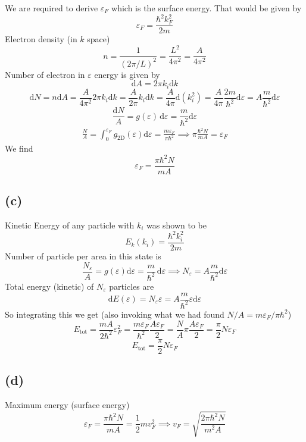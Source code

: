 \documentclass[letter, 10pts]{article}
\newcommand{\hb}{\hbar}
\begin{document}
We are required to derive $\varepsilon_F$ which is the surface energy. That would be given by 
\[
\varepsilon_F = \frac{\hb^2 k_F^2}{2 m}
\] 
Electron density (in $k$ space) \[
n = \frac{1}{(2 \pi  / L )^2 } = \frac{L^2}{4 \pi^2}   = \frac{A}{4 \pi ^2} 
\]
Number of electron in $\varepsilon$ energy is given by 
\[
\mathrm{d} A = 2\pi k_i \mathrm{d} k
\] 
\[
\mathrm{d} N = n \mathrm{d} A = \frac{A}{4 \pi^2}2 \pi k_i \mathrm{d} k = \frac{A}{2\pi } k_i \mathrm{d} k = \frac{A}{4 \pi } \mathrm{d} (k_i^2)  = \frac{A}{4 \pi } \frac{2m}{\hb^2} \mathrm{d} \varepsilon = A \frac{m}{\hb ^2} \mathrm{d} \varepsilon 
\]
\[
\frac{\mathrm{d} N}{A} = g(\varepsilon	) \, \mathrm{d} \varepsilon = \frac{m}{\hb^2} \mathrm{d} \varepsilon 
\] 
\begin{align*}
	\frac{N}{A} = \int_{0}^{\varepsilon_F}  g_{\text{2D}}(\varepsilon) \mathrm{d} \varepsilon  = \frac{m \varepsilon_F}{\pi \hb^2} \implies \pi \frac{\hb^2 N}{m A} = \varepsilon_F
\end{align*}
We find 
\[
\boxed{
\varepsilon_F = \frac{\pi \hb^2 N}{m A}
}
\] 


\subsection*{(c)} 
Kinetic Energy of any particle with $k_i$ was shown to be 
\[
E_k(k_i) = \frac{\hb ^2 k_i^2}{2 m}
\] 
Number of particle per area in this state is 
\[
	\frac{N_\varepsilon}{A} = g(\varepsilon)\mathrm{d} \varepsilon = \frac{m}{\hb^2} \, \mathrm{d} \varepsilon \implies N_\varepsilon = A \frac{m}{\hb^2} \mathrm{d} \varepsilon 
\]
Total energy (kinetic) of $N_\varepsilon$ particles are 
\[
\mathrm{d} E(\varepsilon) = N_\varepsilon \varepsilon = A \frac{m }{\hb^2} \varepsilon \mathrm{d} \varepsilon 
\] 
So integrating this we get (also invoking what we had found $N / A = m \varepsilon_F / \pi \hb^2 $)
\[
E_\text{tot} = \frac{mA}{2\hb^2} \varepsilon_F^2 =   \frac{m \varepsilon_F}{\hb^2} \frac{A \varepsilon_F}{2}  = \frac{N}{A} \pi \frac{A \varepsilon_F}{2} = \frac{\pi}{2} N \varepsilon_F
\] 
\[
\boxed{
E_\text{tot} = \frac{\pi}{2} N \varepsilon_F
}
\] 

\subsection*{(d)} 
Maximum energy (surface energy)
\[
\varepsilon_F = \frac{\pi \hb^2 N}{m A}= \frac{1}{2} m v_F^2   \implies 
\boxed{
v_F = \sqrt{\frac{2 \pi \hb^2 N}{m^2 A}} 
} \] 
\end{document}
